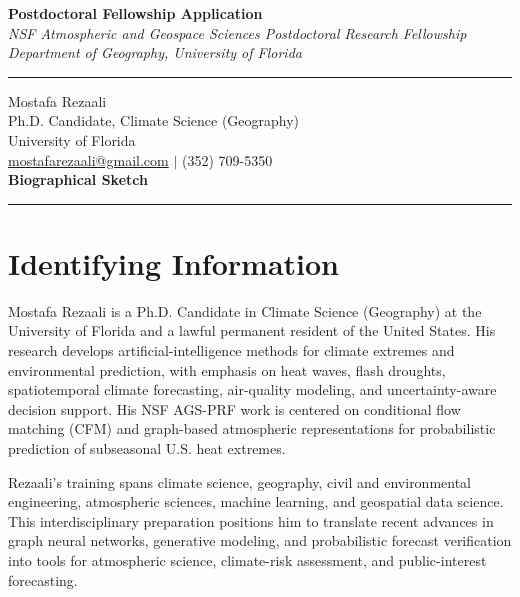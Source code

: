 \documentclass[11pt,letterpaper]{article}
\begin{document}
\begin{center}
    \vspace*{-1.5cm}
    {\Large\bfseries Postdoctoral Fellowship Application} \\[0.2cm]
    {\small\textit{NSF Atmospheric and Geospace Sciences Postdoctoral Research Fellowship}} \\[0.05cm]
    {\small\textit{Department of Geography, University of Florida}} \\[0.1cm]
    \rule{0.6\textwidth}{0.4pt}
\end{center}
\vspace{-0.5cm}

\noindent
Mostafa Rezaali \\
Ph.D. Candidate, Climate Science (Geography) \\
University of Florida \\
\href{mailto:mostafarezaali@gmail.com}{mostafarezaali@gmail.com} \quad $\mid$ \quad (352) 709-5350 \\[0.3cm]
{\large\bfseries Biographical Sketch}\\[-0.15cm]
\rule{\textwidth}{0.4pt}
\section*{Identifying Information}
Mostafa Rezaali is a Ph.D. Candidate in Climate Science (Geography) at the University of Florida and a lawful permanent resident of the United States. His research develops artificial-intelligence methods for climate extremes and environmental prediction, with emphasis on heat waves, flash droughts, spatiotemporal climate forecasting, air-quality modeling, and uncertainty-aware decision support. His NSF AGS-PRF work is centered on conditional flow matching (CFM) and graph-based atmospheric representations for probabilistic prediction of subseasonal U.S. heat extremes.

Rezaali's training spans climate science, geography, civil and environmental engineering, atmospheric sciences, machine learning, and geospatial data science. This interdisciplinary preparation positions him to translate recent advances in graph neural networks, generative modeling, and probabilistic forecast verification into tools for atmospheric science, climate-risk assessment, and public-interest forecasting.
\end{document}

